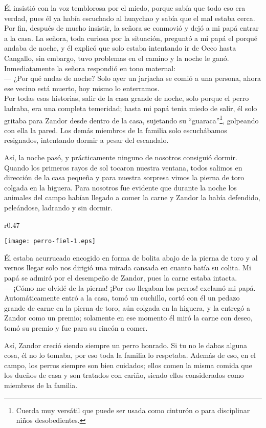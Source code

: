 Él insistió con la voz temblorosa por el miedo, porque sabía que todo eso era verdad, pues él ya había escuchado al huaychao y sabía que el mal estaba cerca. Por fin, después de mucho insistir, la señora se conmovió y dejó a mi papá entrar a la casa.
La señora, toda curiosa por la situación, preguntó a mi papá el porqué andaba de noche, y él explicó que solo estaba intentando ir de Occo hasta Cangallo, sin embargo, tuvo problemas en el camino y la noche le ganó. Inmediatamente la señora respondió en tono maternal:\\\indent 
--- ¿Por qué andas de noche? Solo ayer un jarjacha se comió a una persona, ahora ese vecino está muerto, hoy mismo lo enterramos.\\\indent
Por todas esas historias, salir de la casa grande de noche, solo porque el perro ladraba, era una completa temeridad; hasta mi papá tenia miedo de salir, él solo gritaba para Zandor desde dentro de la casa, sujetando su ``guaraca''\footnote{Cuerda muy versátil que puede ser usada como cinturón o para disciplinar niños desobedientes.}, golpeando con ella la pared.
Los demás miembros de la familia solo escuchábamos resignados, intentando dormir a pesar del escandalo.

Así, la noche pasó, y prácticamente ninguno de nosotros consiguió dormir. Quando los primeros rayos de sol tocaron nuestra ventana, todos salimos en dirección de la casa pequeña y para nuestra sorpresa vimos la pierna de toro colgada en la higuera. Para nosotros fue evidente que durante la noche los animales del campo habían llegado a comer la carne y Zandor la había defendido, peleándose, ladrando y sin dormir. 
\ifdefined\EnableIncludeImages
\begin{wrapfigure}{r}{0.47\textwidth}
  \begin{center}
  \vspace{-0.5cm}
    \texttt{[image: perro-fiel-1.eps]}
  \end{center}
  \vspace{-0.5cm}
\end{wrapfigure}
\fi
Él estaba acurrucado encogido en forma de bolita abajo de la pierna de toro y al vernos llegar solo nos dirigió una mirada cansada en cuanto batía su colita. Mi papá se admiró por el desempeño de Zandor, pues la carne estaba intacta.\\\indent
--- ¡Cómo me olvidé de la pierna! ¡Por eso llegaban los perros! exclamó mi papá.\\\indent
Automáticamente entró a la casa, tomó un cuchillo, cortó con él un pedazo grande de carne en la pierna de toro, aún colgada en la higuera, y la entregó a Zandor como un premio; solamente en ese momento él miró la carne con deseo, tomó su premio y fue para su rincón a comer.

Así, Zandor creció siendo siempre un perro honrado. Si tu no le dabas alguna cosa, él no lo tomaba, por eso toda la familia lo respetaba. Además de eso, en el campo, los perros siempre son bien cuidados; ellos comen la misma comida que los dueños de casa y son tratados con cariño, siendo ellos considerados como miembros de la familia.


